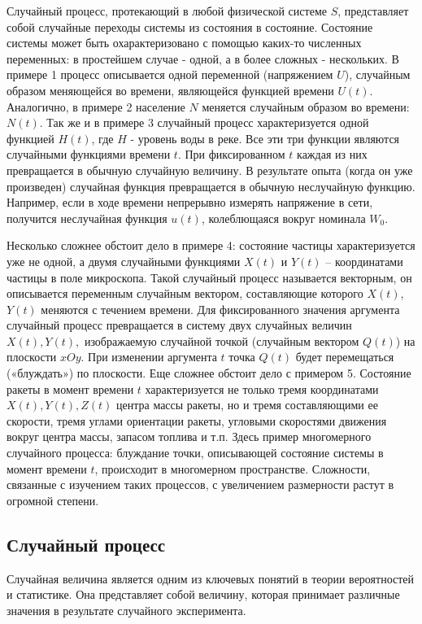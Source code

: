Случайный процесс, протекающий в любой физической системе $S$, представляет собой случайные переходы системы из состояния в состояние. Состояние системы может быть охарактеризовано с помощью каких-то численных переменных: в простейшем случае - одной, а в более сложных - нескольких. В примере 1 процесс описывается одной переменной (напряжением $U$), случайным образом меняющейся во времени, являющейся функцией времени $U(t)$. Аналогично, в примере 2 население $N$ меняется случайным образом во времени: $N(t)$. Так же и в примере 3 случайный процесс характеризуется одной функцией $H(t)$, где $H$ - уровень воды в реке. Все эти три функции являются случайными функциями времени $t$. При фиксированном $t$ каждая из них превращается в обычную случайную величину. В результате опыта (когда он уже произведен) случайная функция превращается в обычную неслучайную функцию. Например, если в ходе времени непрерывно измерять напряжение в сети, получится неслучайная функция $u(t)$, колеблющаяся вокруг номинала $W_0$.

Несколько сложнее обстоит дело в примере 4: состояние частицы характеризуется уже не одной, а двумя случайными функциями $X(t)$ и $Y(t)$ – координатами частицы в поле микроскопа. Такой случайный процесс называется векторным, он описывается переменным случайным вектором, составляющие которого $X(t)$, $Y(t)$ меняются с течением времени. Для фиксированного значения аргумента случайный процесс превращается в систему двух случайных величин $X(t), Y(t),$ изображаемую случайной точкой (случайным вектором $Q(t)$) на плоскости $xOy$. При изменении аргумента $t$ точка $Q(t)$ будет перемещаться («блуждать») по плоскости. Еще сложнее обстоит дело с примером
5. Состояние ракеты в момент времени $t$ характеризуется не только
тремя координатами $X(t), Y(t), Z(t)$ центра массы ракеты, но и тремя составляющими ее скорости, тремя углами ориентации ракеты, угловыми скоростями движения вокруг центра массы, запасом топлива и т.п. Здесь пример многомерного случайного процесса: блуждание точки, описывающей состояние системы в момент времени $t$, происходит в многомерном пространстве. Сложности, связанные с изучением таких процессов, с увеличением размерности растут в огромной степени.

\subsection{Случайный процесс}

Случайная величина является одним из ключевых понятий в теории вероятностей и статистике. Она представляет собой величину, которая принимает различные значения в результате случайного эксперимента. 

